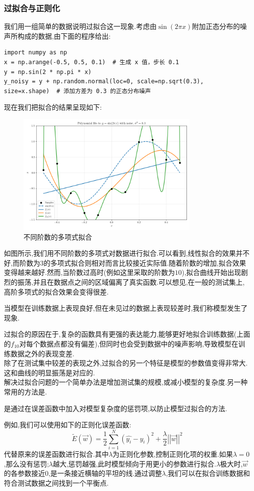 \documentclass{ctexart}
\begin{document}
\subsubsection{过拟合与正则化}
我们用一组简单的数据说明过拟合这一现象.考虑由$\sin(2\pi x)$附加正态分布的噪声所构成的数据,由下面的程序给出:
\begin{lstlisting}
import numpy as np
x = np.arange(-0.5, 0.5, 0.1)  # 生成 x 值，步长 0.1
y = np.sin(2 * np.pi * x)
y_noisy = y + np.random.normal(loc=0, scale=np.sqrt(0.3), size=x.shape)  # 添加方差为 0.3 的正态分布噪声
\end{lstlisting}
现在我们把拟合的结果呈现如下:
\begin{figure}[H]
    \centering
    \includegraphics[width=0.8\textwidth]{figure/overfitting.png}
    \caption{不同阶数的多项式拟合}
\end{figure}
如图所示,我们用不同阶数的多项式对数据进行拟合.可以看到,线性拟合的效果并不好,而阶数为$3$的多项式拟合则相对而言比较接近实际值.随着阶数的增加,拟合效果变得越来越好.然而,当阶数过高时(例如这里采取的阶数为$10$),拟合曲线开始出现剧烈的振荡,并且在数据点之间的区域偏离了真实函数.可以想见,在一般的测试集上,高阶多项式的拟合效果会变得很差.
\begin{definition}[过拟合]
    当模型在训练数据上表现良好,但在未见过的数据上表现较差时,我们称模型发生了现象.
\end{definition}
\indent 过拟合的原因在于,复杂的函数具有更强的表达能力,能够更好地拟合训练数据(上面的$f_{10}$对每个数据点都没有偏差),但同时也会受到数据中的噪声影响,导致模型在训练数据之外的表现变差.\\
\indent 除了在测试集中较差的表现之外,过拟合的另一个特征是模型的参数值变得非常大.这和曲线的明显振荡是对应的.\\
\indent 解决过拟合问题的一个简单办法是增加测试集的规模,或减小模型的复杂度.另一种常用的方法是.
\begin{definition}[正则化]
    是通过在误差函数中加入对模型复杂度的惩罚项,以防止模型过拟合的方法.
\end{definition}
例如,我们可以使用如下的正则化误差函数:
\[\tilde{E}(\vec{w})=\dfrac12\sum_{i=1}^{N}\left(\hat{y_i}-y_i\right)^2+\dfrac{\lambda}{2}\left|\left|\vec{w}\right|\right|^2\]
代替原来的误差函数进行拟合.其中$\lambda$为正则化参数,控制正则化项的权重.如果$\lambda=0$,那么没有惩罚;$\lambda$越大,惩罚越强,此时模型倾向于用更小的参数进行拟合.$\lambda$极大时,$\vec{w}$的各参数接近$0$,是一条接近横轴的平坦的线.通过调整$\lambda$,我们可以在拟合训练数据和符合测试数据之间找到一个平衡点.
\end{document}
